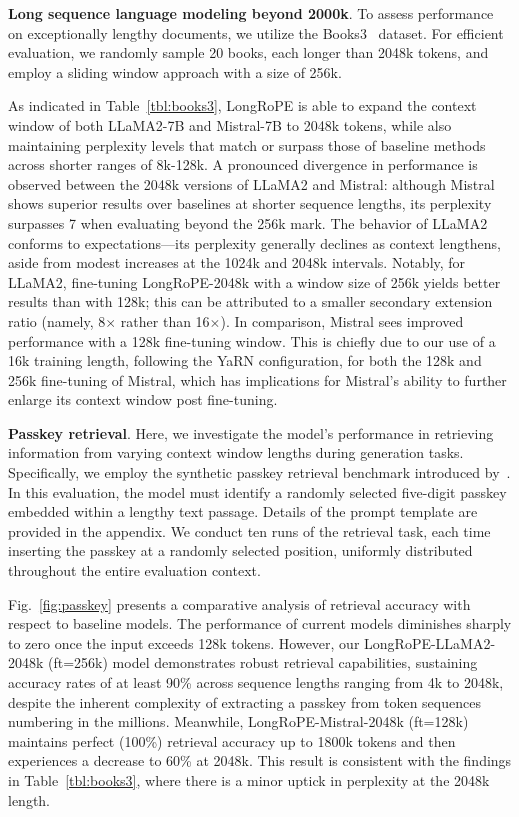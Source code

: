 \textbf{Long sequence language modeling beyond 2000k}. To assess performance on exceptionally lengthy documents, we utilize the Books3~\cite{pile} dataset. For efficient evaluation, we randomly sample 20 books, each longer than 2048k tokens, and employ a sliding window approach with a size of 256k.

As indicated in Table~\ref{tbl:books3}, LongRoPE is able to expand the context window of both LLaMA2-7B and Mistral-7B to 2048k tokens, while also maintaining perplexity levels that match or surpass those of baseline methods across shorter ranges of 8k-128k. A pronounced divergence in performance is observed between the 2048k versions of LLaMA2 and Mistral: although Mistral shows superior results over baselines at shorter sequence lengths, its perplexity surpasses 7 when evaluating beyond the 256k mark. The behavior of LLaMA2 conforms to expectations—its perplexity generally declines as context lengthens, aside from modest increases at the 1024k and 2048k intervals. Notably, for LLaMA2, fine-tuning LongRoPE-2048k with a window size of 256k yields better results than with 128k; this can be attributed to a smaller secondary extension ratio (namely, 8$\times$ rather than 16$\times$). In comparison, Mistral sees improved performance with a 128k fine-tuning window. This is chiefly due to our use of a 16k training length, following the YaRN configuration, for both the 128k and 256k fine-tuning of Mistral, which has implications for Mistral’s ability to further enlarge its context window post fine-tuning.

\textbf{Passkey retrieval}. Here, we investigate the model's performance in retrieving information from varying context window lengths during generation tasks. Specifically, we employ the synthetic passkey retrieval benchmark introduced by~\cite{passkey}. In this evaluation, the model must identify a randomly selected five-digit passkey embedded within a lengthy text passage. Details of the prompt template are provided in the appendix. We conduct ten runs of the retrieval task, each time inserting the passkey at a randomly selected position, uniformly distributed throughout the entire evaluation context.

Fig.~\ref{fig:passkey} presents a comparative analysis of retrieval accuracy with respect to baseline models. The performance of current models diminishes sharply to zero once the input exceeds 128k tokens. However, our LongRoPE-LLaMA2-2048k (ft=256k) model demonstrates robust retrieval capabilities, sustaining accuracy rates of at least 90\% across sequence lengths ranging from 4k to 2048k, despite the inherent complexity of extracting a passkey from token sequences numbering in the millions. Meanwhile, LongRoPE-Mistral-2048k (ft=128k) maintains perfect (100\%) retrieval accuracy up to 1800k tokens and then experiences a decrease to 60\% at 2048k. This result is consistent with the findings in Table~\ref{tbl:books3}, where there is a minor uptick in perplexity at the 2048k length.

